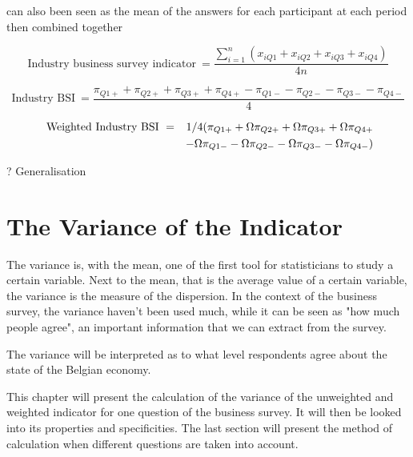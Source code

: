 \documentclass[12pt,a4paper,oneside]{book}
\begin{document}
can also been seen as the mean of the answers for each participant at each period then combined together

\begin{equation}
    \mbox{Industry business survey indicator}\ = \frac{\sum_{i=1}^n \left(x_{i Q1} + x_{i Q2} + x_{i Q3} + x_{i Q4} \right)}{4n}
\end{equation}

\begin{equation}
    \mbox{Industry BSI}\ = \frac{\pi_{Q1+} + \pi_{Q2+} + \pi_{Q3+} + \pi_{Q4+} - \pi_{Q1-} - \pi_{Q2-} - \pi_{Q3-} - \pi_{Q4-} }{4}
\end{equation}


\begin{eqnarray}
    \mbox{ Weighted Industry BSI}\ &=& 1/4 ( \pi_{Q1+} + \Omega \pi_{Q2+} + \Omega \pi_{Q3+} + \Omega \pi_{Q4+} \\
    && - \Omega \pi_{Q1-} - \Omega \pi_{Q2-} - \Omega \pi_{Q3-} - \Omega \pi_{Q4-} \Large) 
\end{eqnarray}

? Generalisation 

\chapter{The Variance of the Indicator}

The variance is, with the mean, one of the first tool for statisticians to study a certain variable. 
Next to the mean, that is the average value of a certain variable, the variance is the measure of the dispersion. 
In the context of the business survey, the variance haven't been used much, while it can be seen as "how much people agree", an important information that we can extract from the survey.

The variance will be interpreted as to what level respondents agree about the state of the Belgian economy.


This chapter will present the calculation of the variance of the unweighted and weighted indicator for one question of the business survey. It will then be looked into its properties and specificities.
The last section will present the method of calculation when different questions are taken into account.
\end{document}
